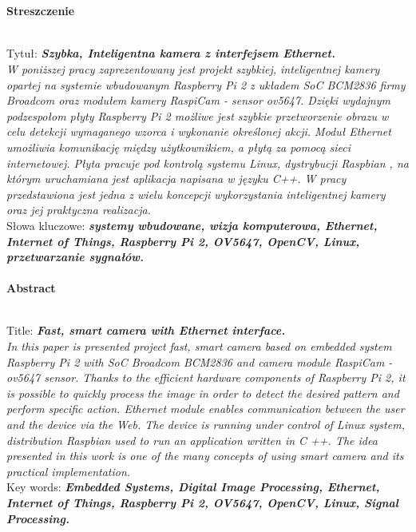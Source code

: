 \newpage
{} %

\begingroup
\let\clearpage\relax
\let\cleardoublepage\relax
\let\cleardoublepage\relax

\hfill \\
\vspace{0.1cm} 
\hfill \\
{\LARGE \textbf{Streszczenie \\ \vspace{0.5cm} \\ }}

Tytuł: \textbf{\textit{Szybka, Inteligentna kamera z interfejsem Ethernet.}} \\

\textit{W poniższej pracy zaprezentowany jest projekt szybkiej, inteligentnej kamery opartej na systemie wbudowanym Raspberry Pi 2 z układem SoC BCM2836 firmy Broadcom oraz modułem kamery RaspiCam -  sensor ov5647. 
Dzięki wydajnym podzespołom płyty Raspberry Pi 2 możliwe jest szybkie przetworzenie obrazu w celu detekcji wymaganego wzorca i wykonanie określonej akcji.
Moduł Ethernet umożliwia komunikację między użytkownikiem, a płytą za pomocą sieci internetowej.
Płyta pracuje pod kontrolą systemu Linux, dystrybucji Raspbian , na którym uruchamiana jest aplikacja napisana w języku C++.
W pracy przedstawiona jest jedna z wielu koncepcji wykorzystania inteligentnej kamery oraz jej praktyczna realizacja.} \\

Słowa kluczowe: \textbf{\textit{systemy wbudowane, wizja komputerowa, Ethernet, Internet of Things, Raspberry Pi 2, OV5647, OpenCV, Linux, przetwarzanie sygnałów. }} 
\\
\vspace{1cm} \\

{\LARGE \textbf{Abstract \\ \vspace{0.5cm} \\ }}

Title: \textbf{\textit{Fast, smart camera with Ethernet interface.}} \\

\textit{In this paper is presented project fast, smart camera based on embedded system Raspberry Pi 2 with SoC Broadcom BCM2836 and camera module RaspiCam - ov5647 sensor.
Thanks to the efficient hardware components of Raspberry Pi 2, it is possible to quickly process the image in order to detect the desired pattern and perform specific action.
Ethernet module enables communication between the user and the device via the Web.
The device is running under control of Linux system, distribution Raspbian used to run an application written in C ++.
The idea presented in this work is one of the many concepts of using smart camera and its practical implementation.} \\

Key words: \textbf{\textit{Embedded Systems, Digital Image Processing, Ethernet, Internet of Things, Raspberry Pi 2, OV5647, OpenCV, Linux, Signal Processing.}}

\endgroup			

\newpage